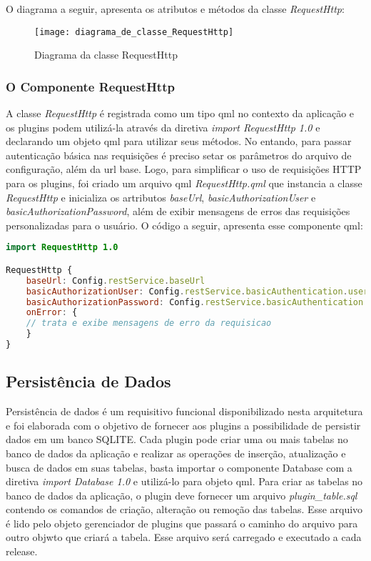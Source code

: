 O diagrama a seguir, apresenta os atributos e métodos da classe \textit{RequestHttp}:

\begin{figure}[h]
	\texttt{[image: diagrama\_de\_classe\_RequestHttp]}
	\centering
	\caption{Diagrama da classe RequestHttp}
\end{figure}


\subsubsection{O Componente RequestHttp}\label{sec:solucao-desenvolvida}
A classe \textit{RequestHttp} é registrada como um tipo qml no contexto da aplicação e os plugins podem utilizá-la através da diretiva \textit{import RequestHttp 1.0} e declarando um objeto qml para utilizar seus métodos. No entando, para passar autenticação básica nas requisições é preciso setar os parâmetros do arquivo de configuração, além da url base. Logo, para simplificar o uso de requisições HTTP para os plugins, foi criado um arquivo qml \textit{RequestHttp.qml} que instancia a classe \textit{RequestHttp} e inicializa os artributos \textit{baseUrl}, \textit{basicAuthorizationUser} e \textit{basicAuthorizationPassword}, além de exibir mensagens de erros das requisições personalizadas para o usuário. O código a seguir, apresenta esse componente qml:

\begin{center}
\begin{lstlisting}[language=qml, basicstyle=\tiny]
import RequestHttp 1.0 

RequestHttp {
    baseUrl: Config.restService.baseUrl
    basicAuthorizationUser: Config.restService.basicAuthentication.userName
    basicAuthorizationPassword: Config.restService.basicAuthentication.userPass
    onError: {
	// trata e exibe mensagens de erro da requisicao
    }
}
\end{lstlisting}
\end{center}


\subsection{Persistência de Dados}\label{sec:solucao-desenvolvida}
Persistência de dados é um requisitivo funcional disponibilizado nesta arquitetura e foi elaborada com o objetivo de fornecer aos plugins a possibilidade de persistir dados em um banco SQLITE. Cada plugin pode criar uma ou mais tabelas no banco de dados da aplicação e realizar as operações de inserção, atualização e busca de dados em suas tabelas, basta importar o componente Database com a diretiva \textit{import Database 1.0} e utilizá-lo para objeto qml. Para criar as tabelas no banco de dados da aplicação, o plugin deve fornecer um arquivo \textit{plugin\_table.sql} contendo os comandos de criação, alteração ou remoção das tabelas. Esse arquivo é lido pelo objeto gerenciador de plugins que passará o caminho do arquivo para outro objwto que criará a tabela. Esse arquivo será carregado e executado a cada release.\par

